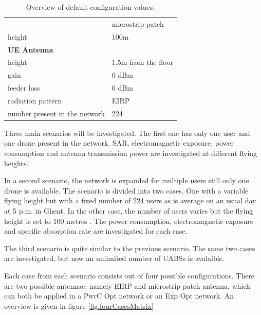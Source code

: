 \documentclass[twocolumn]{phdsymp} %
\begin{document}
\begin{table}[!htb]
\begin{tabular}[t]{ll}
         \hspace{3mm}                           & microstrip patch\\
        \hspace{3mm}  height                    & 100m  \\
        \hline
        \multicolumn{2}{l}{\textbf{UE Antenna}} \\
        \hline 
        \hspace{3mm} height                     & 1.5m from the floor       \\ 
        \hspace{3mm} gain                      & 0 dBm   \\ 
        \hspace{3mm} feeder loss               & 0 dBm   \\ 
        \hspace{3mm} radiation pattern         & EIRP  \\
        \hspace{3mm} number present in the network         & 224  \\
        \toprule
\end{tabular}
\caption{Overview of default configuration values.}
\label{table:defaultconf}
\end{table}

Three main scenarios will be investigated. 
The first one has only one user and one drone present in the network. 
SAR, electromagnetic exposure, power consumption 
and antenna transmission power are investigated at different flying heights.

In a second scenario, the network is expanded for multiple users still only one drone is available. 
The scenario is divided into two cases. One with a variable flying height but with a fixed 
number of 224 users as is average on an usual day at 5 p.m. in Ghent.
 In the other case, the number of users varies but the flying height is set to 100 metres \cite{J2}.
The power consumption, electromagnetic exposure and specific 
absorption rate are investigated for each case.

The third scenario is quite similar to the previous scenario. The same two cases are investigated, but now an unlimited number of \gls{UABS}s is avalaible.

Each case from each scenario consists out of four possible configurations.
There are two possible antennae, namely EIRP 
and microstrip patch antenna, which can both be applied in a \gls{PwrC Opt} network or an \gls{Exp Opt} network.
An overview is given in figure \ref{fig:fourCasesMatrix}
\end{document}
